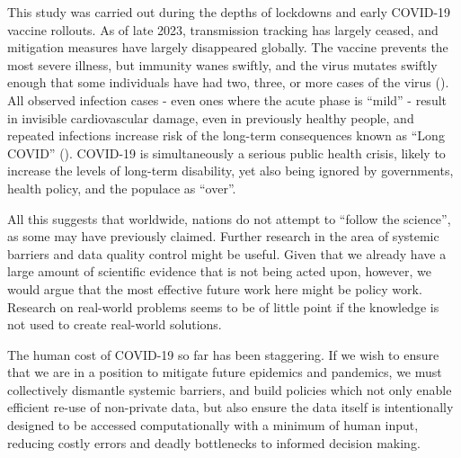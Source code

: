 \documentclass{CUP-JNL-DAP}%
\begin{document}
This study was carried out during the depths of lockdowns and early COVID-19 vaccine rollouts. As of late 2023, transmission tracking has largely ceased, and mitigation measures have largely disappeared globally. The vaccine prevents the most severe illness, but immunity wanes swiftly, and the virus mutates swiftly enough that some individuals have had two, three, or more cases of the virus (\cite{collaboratory_burden_2022}). All observed infection cases - even ones where the acute phase is “mild” - result in invisible cardiovascular damage, even in previously healthy people, and repeated infections increase risk of the long-term consequences known as “Long COVID” (\cite{davis_et_al}). COVID-19 is simultaneously a serious public health crisis, likely to increase the levels of long-term disability, yet also being ignored by governments, health policy, and the populace as “over”. 

All this suggests that worldwide, nations do not attempt to “follow the science”, as some may have previously claimed. Further research in the area of systemic barriers and data quality control might be useful. Given that we already have a large amount of scientific evidence that is not being acted upon, however, we would argue that the most effective future work here might be policy work. Research on real-world problems seems to be of little point if the knowledge is not used to create real-world solutions. 

The human cost of COVID-19 so far has been staggering. If we wish to ensure that we are in a position to mitigate future epidemics and pandemics, we must collectively dismantle systemic barriers, and build policies which not only enable efficient re-use of non-private data, but also ensure the data itself is intentionally designed to be accessed computationally with a minimum of human input, reducing costly errors and deadly bottlenecks to informed decision making. 
\end{document}
